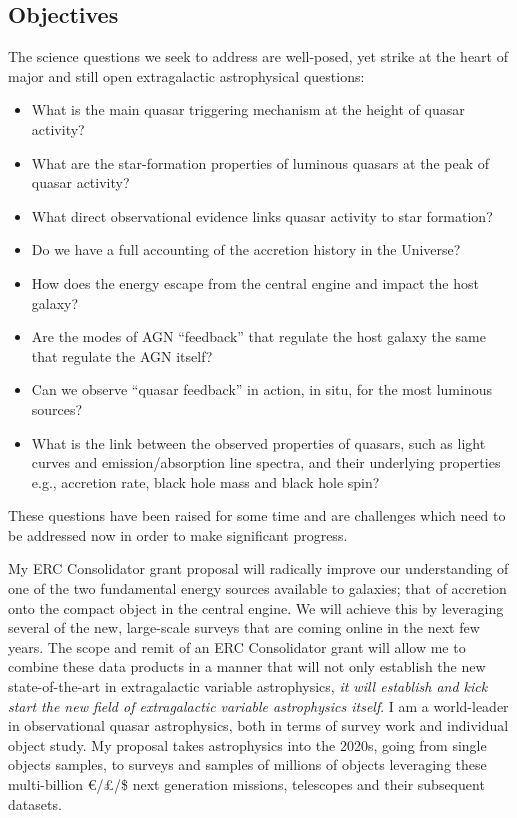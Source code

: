 \subsection{Objectives}
\noindent
The science questions we seek to address are well-posed, yet strike at the heart of major and still
open extragalactic astrophysical questions: \\

\begin{itemize}
\item What is the main quasar triggering mechanism at the height of quasar activity? 
\item What are the star-formation properties of luminous quasars at the peak of quasar activity? 
\item What direct observational evidence links quasar activity to star formation?  
\item Do we have a full accounting of the accretion history in the Universe?   
\item How does the energy escape from the central engine and impact the host galaxy?  
\item Are the modes of AGN ``feedback'' that regulate the host galaxy the same that regulate the AGN itself?  
\item Can we observe ``quasar feedback'' in action, in situ, for the most luminous sources?   
\item What is the link between the observed properties of quasars, such as light curves and emission/absorption line spectra, 
and their underlying properties e.g., accretion rate, black hole mass and black hole spin? 
\end{itemize}

\smallskip
\smallskip
\noindent
These questions have been raised for some time and are challenges
which need to be addressed now in order to make significant progress.


\smallskip
\smallskip
\noindent
My ERC Consolidator grant proposal will radically improve our
understanding of one of the two fundamental energy sources available
to galaxies; that of accretion onto the compact object in the central
engine. We will achieve this by leveraging several of the new,
large-scale surveys that are coming online in the next few years.  The
scope and remit of an ERC Consolidator grant will allow me to combine
these data products in a manner that will not only establish the new
state-of-the-art in extragalactic variable astrophysics, {\it it will
establish and kick start the new field of extragalactic variable
astrophysics itself}.  I am a world-leader in observational quasar
astrophysics, both in terms of survey work and individual object
study.  My proposal takes astrophysics into the 2020s, going from
single objects samples, to surveys and samples of millions of objects
leveraging these multi-billion \euro/\pounds/\$ next generation
missions, telescopes and their subsequent datasets.



